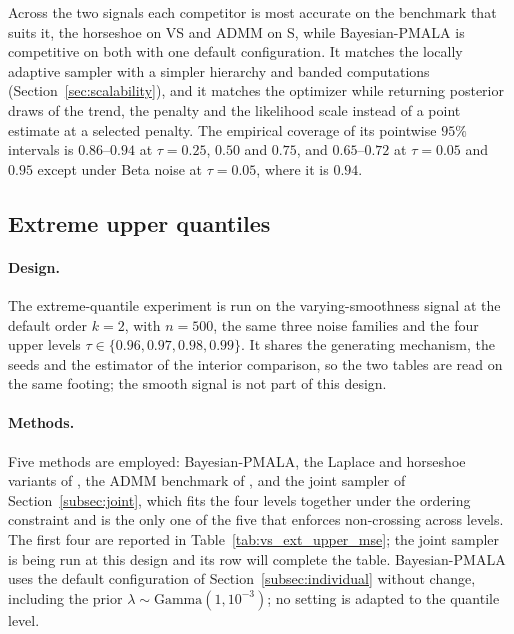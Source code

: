 Across the two signals each competitor is most accurate on the benchmark that suits it, the horseshoe on VS and ADMM on S, while Bayesian-PMALA is competitive on both with one default configuration. It matches the locally adaptive sampler with a simpler hierarchy and banded computations (Section~\ref{sec:scalability}), and it matches the optimizer while returning posterior draws of the trend, the penalty and the likelihood scale instead of a point estimate at a selected penalty. The empirical coverage of its pointwise $95\%$ intervals is $0.86$--$0.94$ at $\tau=0.25$, $0.50$ and $0.75$, and $0.65$--$0.72$ at $\tau=0.05$ and $0.95$ except under Beta noise at $\tau=0.05$, where it is $0.94$.

\subsection{Extreme upper quantiles}
\label{sec:sim:extreme}

\paragraph{Design.} The extreme-quantile experiment is run on the varying-smoothness signal at the default order $k=2$, with $n=500$, the same three noise families and the four upper levels $\tau\in\{0.96,0.97,0.98,0.99\}$. It shares the generating mechanism, the seeds and the estimator of the interior comparison, so the two tables are read on the same footing; the smooth signal is not part of this design.

\paragraph{Methods.} Five methods are employed: Bayesian-PMALA, the Laplace and horseshoe variants of \citet{onizuka2024fast}, the ADMM benchmark of \citet{brantley2020baseline}, and the joint sampler of Section~\ref{subsec:joint}, which fits the four levels together under the ordering constraint and is the only one of the five that enforces non-crossing across levels. The first four are reported in Table~\ref{tab:vs_ext_upper_mse}; the joint sampler is being run at this design and its row will complete the table. Bayesian-PMALA uses the default configuration of Section~\ref{subsec:individual} without change, including the prior $\lambda\sim\mathrm{Gamma}(1,10^{-3})$; no setting is adapted to the quantile level.

